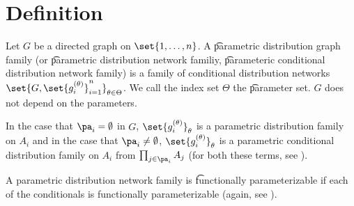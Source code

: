
\section*{Definition}

Let $G$ be a directed graph on $\set{1,\dots , n}$.
A \t{parametric distribution graph family} (or \t{parametric distribution network familiy}, \t{parameteric conditional distribution network family}) is a family of conditional distribution networks $\set{G, \set{g_i^{(\theta )}}_{i=1}^{n}}_{\theta  \in \Theta }$.
We call the index set $\Theta $ the \t{parameter set}.
$G$ does not depend on the parameters.

In the case that $\pa_i = \emptyset$ in $G$, $\set{g_i^{(\theta )}}_\theta $ is a parametric distribution family on $A_i$ and in the case that $\pa_i \neq \emptyset$, $\set{g_i^{(\theta )}}_{\theta }$ is a parametric conditional distribution family on $A_i$ from $\prod_{j \in \pa_{i}} A_j$ (for both these terms, see ).

A parametric distribution network family is \t{functionally parameterizable} if each of the conditionals is functionally parameterizable (again, see ).

\blankpage